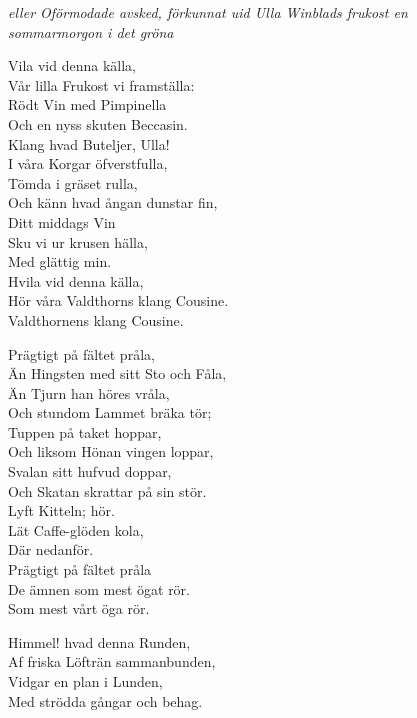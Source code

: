 {\footnotesize\textit{eller Oförmodade avsked, förkunnat uid Ulla Winblads 
frukost en\\sommarmorgon i det gröna}}\par
\vspace{10pt}
Vila vid denna källa,\\ 
Vår lilla Frukost vi framställa:\\ 
Rödt Vin med Pimpinella\\ 
Och en nyss skuten Beccasin.\\ 
Klang hvad Buteljer, Ulla! \\ 
I våra Korgar öfverstfulla,\\ 
Tömda i gräset rulla,\\ 
Och känn hvad ångan dunstar fin,\\ 
Ditt middags Vin\\ 
Sku vi ur krusen hälla,\\ 
Med glättig min.\\ 
Hvila vid denna källa,\\ 
Hör våra Valdthorns klang Cousine.\\ 
Valdthornens klang Cousine.\par
\vspace{10pt}
Prägtigt på fältet pråla,\\ 
Än Hingsten med sitt Sto och Fåla,\\ 
Än Tjurn han höres vråla,\\ 
Och stundom Lammet bräka tör;\\ 
Tuppen på taket hoppar,\\ 
Och liksom Hönan vingen loppar,\\ 
Svalan sitt hufvud doppar,\\ 
Och Skatan skrattar på sin stör.\\ 
Lyft Kitteln; hör.\\ 
Lät Caffe-glöden kola,\\ 
Där nedanför.\\ 
Prägtigt på fältet pråla\\  
De ämnen som mest ögat rör.\\ 
Som mest vårt öga rör.\par
\vspace{10pt}
Himmel! hvad denna Runden,\\ 
Af friska Löfträn sammanbunden,\\ 
Vidgar en plan i Lunden,\\ 
Med strödda gångar och behag.\\ 
